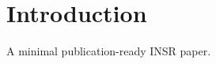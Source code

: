 \documentclass[config/load-project=false,document/type=paper,metadata/author={INSR Example Author},metadata/institution={INSR Example Institution},metadata/title={Minimal Publication},publication/type={Preprint},publication/status={draft}]{insr}
\begin{document}
\INSRMakeTitle\section{Introduction}A minimal publication-ready INSR paper.
\end{document}
